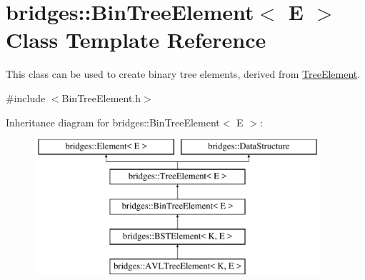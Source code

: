 \hypertarget{classbridges_1_1_bin_tree_element}{}\section{bridges\+:\+:Bin\+Tree\+Element$<$ E $>$ Class Template Reference}
\label{classbridges_1_1_bin_tree_element}


This class can be used to create binary tree elements, derived from \hyperlink{classbridges_1_1_tree_element}{Tree\+Element}.  




{\ttfamily \#include $<$Bin\+Tree\+Element.\+h$>$}

Inheritance diagram for bridges\+:\+:Bin\+Tree\+Element$<$ E $>$\+:\begin{figure}[H]
\begin{center}
\leavevmode
\includegraphics[height=5.000000cm]{classbridges_1_1_bin_tree_element}
\end{center}
\end{figure}
